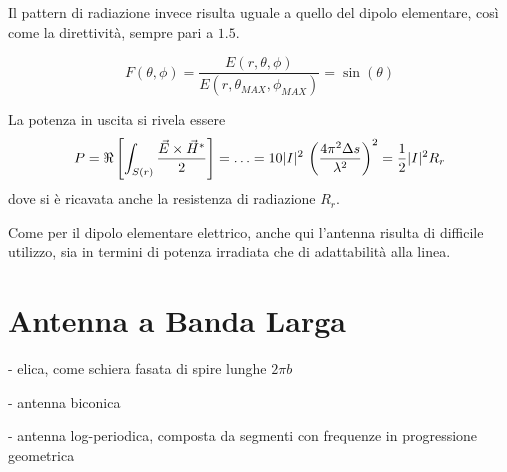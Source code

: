 Il pattern di radiazione invece risulta uguale a quello del dipolo elementare, così come la direttività, sempre pari a $1.5$.

\begin{equation}
	F(\theta, \phi)
	= \frac{E(r, \theta, \phi)}{E(r, \theta_{MAX}, \phi_{MAX})} = \sin(\theta)
\end{equation}

La potenza in uscita si rivela essere
\begin{equation*}
	P
	= \Re \left[
		\int_{S(r)} \frac{\vec{E} \times \vec{H}^*}{2}
	\right]
	= \ldots
	= 10 |I|^2 \, \left(
		\frac{4\pi^2 \Delta s}{\lambda^2}
	\right)^2
	= \frac{1}{2} |I|^2 R_r
\end{equation*}
dove si è ricavata anche la resistenza di radiazione $R_r$.

Come per il dipolo elementare elettrico, anche qui l'antenna risulta di difficile utilizzo, sia in termini di potenza irradiata che di adattabilità alla linea.

\section{Antenna a Banda Larga}
- elica, come schiera fasata di spire lunghe $2\pi b$

- antenna biconica

- antenna log-periodica, composta da segmenti con frequenze in progressione geometrica

